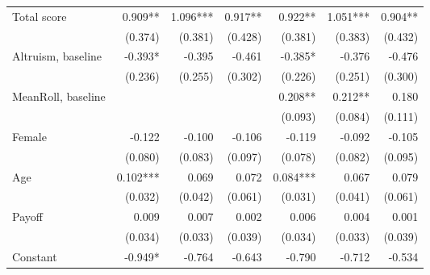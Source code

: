 \begin{table}[htbp]
\begin{adjustbox}{width=1\textwidth}
\begin{threeparttable}
\begin{tabular}{l*{6}{D{.}{.}{-1}}}
\midrule
Total score         &               0.909** &               1.096***&               0.917** &               0.922** &               1.051***&               0.904** \\
                    &             (0.374)   &             (0.381)   &             (0.428)   &             (0.381)   &             (0.383)   &             (0.432)   \\
Altruism, baseline  &              -0.393*  &              -0.395   &              -0.461   &              -0.385*  &              -0.376   &              -0.476   \\
                    &             (0.236)   &             (0.255)   &             (0.302)   &             (0.226)   &             (0.251)   &             (0.300)   \\
MeanRoll, baseline  &                       &                       &                       &               0.208** &               0.212** &               0.180   \\
                    &                       &                       &                       &             (0.093)   &             (0.084)   &             (0.111)   \\
Female              &              -0.122   &              -0.100   &              -0.106   &              -0.119   &              -0.092   &              -0.105   \\
                    &             (0.080)   &             (0.083)   &             (0.097)   &             (0.078)   &             (0.082)   &             (0.095)   \\
Age                 &               0.102***&               0.069   &               0.072   &               0.084***&               0.067   &               0.079   \\
                    &             (0.032)   &             (0.042)   &             (0.061)   &             (0.031)   &             (0.041)   &             (0.061)   \\
Payoff              &               0.009   &               0.007   &               0.002   &               0.006   &               0.004   &               0.001   \\
                    &             (0.034)   &             (0.033)   &             (0.039)   &             (0.034)   &             (0.033)   &             (0.039)   \\
Constant            &              -0.949*  &              -0.764   &              -0.643   &              -0.790   &              -0.712   &              -0.534   \\

\end{tabular}
\end{threeparttable}
\end{adjustbox}
\end{table}

